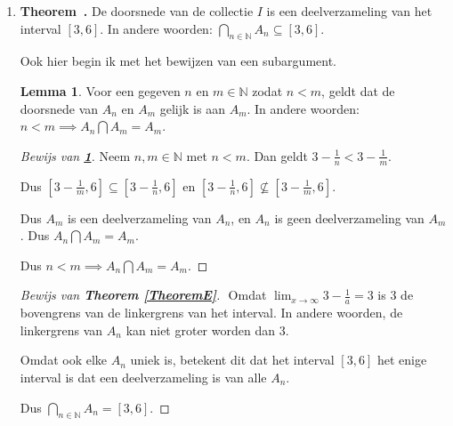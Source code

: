 \documentclass[12pt, dutch, a4paper]{article}
\theoremstyle{definition}
\newtheorem{lemma}{Lemma}[theorem]
\newenvironment{shortthm}
  {\refstepcounter{theorem}\textbf{Theorem~\thetheorem.}}%
{\enskip}
\begin{document}
\begin{enumerate}[(a.)]
\begin{proof}[Bewijs van \textbf{Theorem \ref{theoremD}.}]
        Dus er bestaat geen $n \in \mathbb{N}$ zodat $3 - \tfrac{1}{n} > 3$. \newline
        Dus $[3,6] \subseteq A_n$ voor elke $n$.

        Dus $[3,6] \subseteq \bigcap_{n \in \mathbb{N}}A_n$. \newline
    \end{proof}
    \bigskip

    \item 
    \begin{shortthm} \label{TheoremE}
        De doorsnede van de collectie $I$ is een deelverzameling van het interval $[3,6]$.
        In andere woorden: $\bigcap_{n \in \mathbb{N}}A_n \subseteq [3,6]$.
    \end{shortthm}

    Ook hier begin ik met het bewijzen van een subargument.

    \begin{lemma} \label{LemmaE}
        Voor een gegeven $n$ en $m \in \mathbb{N}$ zodat $n < m$, 
        geldt dat de doorsnede van $A_n$ en $A_m$ gelijk is aan $A_m$.  
        In andere woorden: \newline
        $n < m \implies A_n \bigcap A_m = A_m$.
    \end{lemma}

    \begin{proof}[Bewijs van \textbf{\cref{LemmaE}}]
        Neem $n,m \in \mathbb{N}$ met $n < m$. \newline
        Dan geldt $3 - \frac{1}{n} < 3 - \frac{1}{m}$.

        Dus $[3 - \frac{1}{m}, 6] \subseteq [3 - \frac{1}{n}, 6]$ en 
        $[3 - \frac{1}{n}, 6] \nsubseteq [3 - \frac{1}{m}, 6]$.

        Dus $A_m$ is een deelverzameling van $A_n$, 
        en $A_n$ is geen deelverzameling van $A_m$. \newline
        Dus $A_n \bigcap A_m = A_m$.

        Dus $n < m \implies A_n \bigcap A_m = A_m$. \newline
    \end{proof}
    \bigskip

    \begin{proof}[Bewijs van \textbf{Theorem \ref{TheoremE}}] $ $ \newline
        Omdat $\lim_{x\to\infty} 3-\tfrac{1}{a} = 3$ 
        is 3 de bovengrens van de linkergrens van het interval. In andere woorden,
        de linkergrens van $A_n$ kan niet groter worden dan 3.

        Omdat ook elke $A_n$ uniek is, 
        betekent dit dat het interval $[3,6]$ het enige interval is 
        dat een deelverzameling is van alle $A_n$.

        Dus $\bigcap_{n \in \mathbb{N}}A_n = [3,6]$. \newline
    \end{proof}
\end{enumerate}
\end{document}
